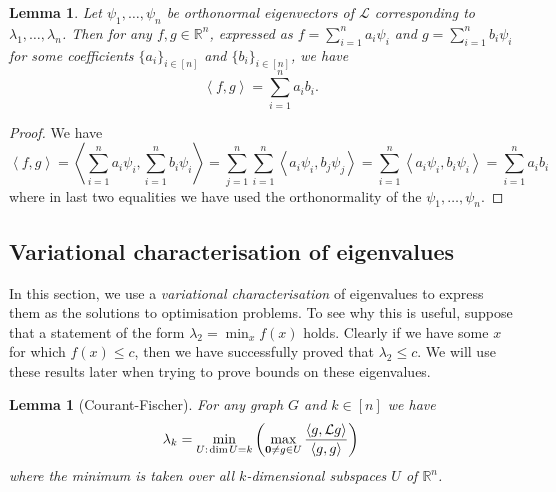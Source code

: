 \documentclass[a4paper,11pt]{article}
\newtheorem{lemma}[theorem]{Lemma}
\theoremstyle{definition}
\newcommand{\R}{\mathbb{R}}
\renewcommand{\L}{\mathcal{L}}
\newcommand{\rayleighinner}[1]{\frac {\inner{#1}{\L #1}} {\inner{#1}{#1}} }
\newcommand{\inner}[2]{\left\langle #1, #2 \right\rangle}
\begin{document}
\begin{lemma}\label{spectral-inner-decomp}
Let $\psi_1, \dots, \psi_n$ be orthonormal eigenvectors of $\L$ corresponding to $\lambda_1, \dots, \lambda_n$. Then for any $f, g \in \R^n$, expressed as $f = \sum_{i=1}^n a_i \psi_i$ and $g = \sum_{i=1}^n b_i \psi_i$ for some coefficients $\{a_i\}_{i \in [n]}$ and $\{b_i\}_{i \in [n]}$, we have
\[
\inner{f}{g} = \sum_{i=1}^n a_i b_i.
\]
\end{lemma}
\begin{proof}
We have
\[
\inner{f}{g} = \inner{\sum_{i=1}^n a_i\psi_i}{\sum_{i=1}^n b_i\psi_i} = \sum_{j=1}^n \sum_{i=1}^n \inner{a_i \psi_i}{b_j\psi_j} = \sum_{i=1}^n \inner{a_i\psi_i}{b_i \psi_i} = \sum_{i=1}^n a_ib_i
\]
where in last two equalities we have used the orthonormality of the $\psi_1, \dots, \psi_n$.
\end{proof}

\subsection{Variational characterisation of eigenvalues}\label{variational-characterisation}

In this section, we use a \emph{variational characterisation} of eigenvalues to express them as the solutions to optimisation problems. To see why this is useful, suppose that a statement of the form $\lambda_2 = \min_{x} f(x)$ holds. Clearly if we have some $x$ for which $f(x) \le c$, then we have successfully proved that $\lambda_2 \le c$. We will use these results later when trying to prove bounds on these eigenvalues.

\begin{lemma}[Courant-Fischer]\label{courant-fischer} For any graph $G$ and $k \in [n]$ we have
\[
\lambda_k = \min_{U : \hspace{0.1em}\mathrm{dim}\hspace{0.1em} U = k} \left(\max_{\bm{0} \ne g \in U} \rayleighinner{g} \right)
\]
where the minimum is taken over all $k$-dimensional subspaces $U$ of $\R^n$. 
\end{lemma}
\end{document}
